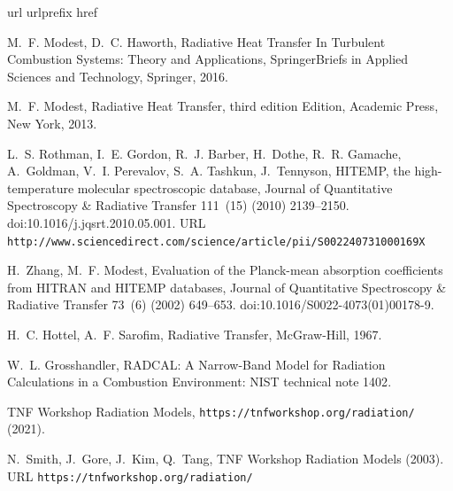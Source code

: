 \documentclass[preprint,12pt]{elsarticle}
\begin{document}

%
%

    \begin{thebibliography}{10}
        \expandafter\ifx\csname url\endcsname\relax
        \def\url#1{\texttt{#1}}\fi
\expandafter\ifx\csname urlprefix\endcsname\relax\def\urlprefix{URL }\fi
\expandafter\ifx\csname href\endcsname\relax
\def\href#1#2{#2} \def\path#1{#1}\fi

M.~F. Modest, D.~C. Haworth, {Radiative Heat Transfer In Turbulent Combustion
Systems: Theory and Applications}, {SpringerBriefs in Applied Sciences and
Technology}, Springer, 2016.

M.~F. Modest, {Radiative Heat Transfer}, third edition Edition, {Academic
Press}, New York, 2013.

L.~S. Rothman, I.~E. Gordon, R.~J. Barber, H.~Dothe, R.~R. Gamache, A.~Goldman,
V.~I. Perevalov, S.~A. Tashkun, J.~Tennyson,
\href{http://www.sciencedirect.com/science/article/pii/S002240731000169X}{{{HITEMP},
the high-temperature molecular spectroscopic database}}, {Journal of
Quantitative Spectroscopy {\&} Radiative Transfer} 111~(15) (2010)
2139--2150.
\newblock \href {http://dx.doi.org/10.1016/j.jqsrt.2010.05.001}
  {\path{doi:10.1016/j.jqsrt.2010.05.001}}.
\newline\urlprefix\url{http://www.sciencedirect.com/science/article/pii/S002240731000169X}

H.~Zhang, M.~F. Modest, {Evaluation of the Planck-mean absorption coefficients
from HITRAN and HITEMP databases}, {Journal of Quantitative Spectroscopy {\&}
Radiative Transfer} 73~(6) (2002) 649--653.
\newblock \href {http://dx.doi.org/10.1016/S0022-4073(01)00178-9}
  {\path{doi:10.1016/S0022-4073(01)00178-9}}.

H.~C. Hottel, A.~F. Sarofim, {Radiative Transfer}, McGraw-Hill, 1967.

W.~L. Grosshandler, {{RADCAL}: A Narrow-Band Model for Radiation Calculations
in a Combustion Environment: NIST technical note 1402}.

{TNF Workshop Radiation Models}, \url{https://tnfworkshop.org/radiation/}
(2021).

N.~Smith, J.~Gore, J.~Kim, Q.~Tang,
\href{https://tnfworkshop.org/radiation/}{{{TNF} Workshop Radiation Models}}
(2003).
\newline\urlprefix\url{https://tnfworkshop.org/radiation/}


\end{thebibliography}
\end{document}
